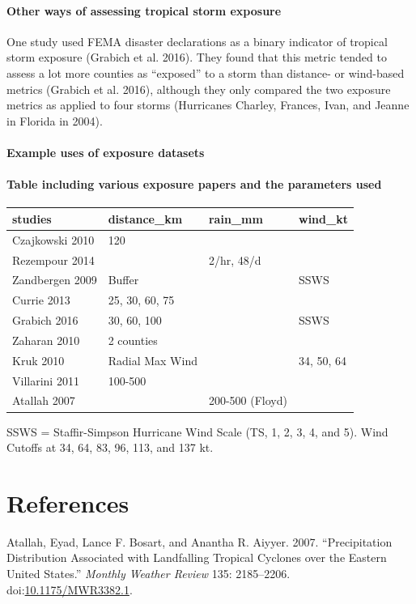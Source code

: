 \documentclass[]{elsarticle} %
\begin{document}
\paragraph{Other ways of assessing tropical storm
exposure}\label{other-ways-of-assessing-tropical-storm-exposure}

One study used FEMA disaster declarations as a binary indicator of
tropical storm exposure (Grabich et al. 2016). They found that this
metric tended to assess a lot more counties as ``exposed'' to a storm
than distance- or wind-based metrics (Grabich et al. 2016), although
they only compared the two exposure metrics as applied to four storms
(Hurricanes Charley, Frances, Ivan, and Jeanne in Florida in 2004).

\paragraph{Example uses of exposure
datasets}\label{example-uses-of-exposure-datasets}

\paragraph{Table including various exposure papers and the parameters
used}\label{table-including-various-exposure-papers-and-the-parameters-used}

\begin{longtable}[]{@{}llll@{}}
\toprule
studies & distance\_km & rain\_mm & wind\_kt\tabularnewline
\midrule
\endhead
Czajkowski 2010 & 120 & &\tabularnewline
Rezempour 2014 & & 2/hr, 48/d &\tabularnewline
Zandbergen 2009 & Buffer & & SSWS\tabularnewline
Currie 2013 & 25, 30, 60, 75 & &\tabularnewline
Grabich 2016 & 30, 60, 100 & & SSWS\tabularnewline
Zaharan 2010 & 2 counties & &\tabularnewline
Kruk 2010 & Radial Max Wind & & 34, 50, 64\tabularnewline
Villarini 2011 & 100-500 & &\tabularnewline
Atallah 2007 & & 200-500 (Floyd) &\tabularnewline
\bottomrule
\end{longtable}

SSWS = Staffir-Simpson Hurricane Wind Scale (TS, 1, 2, 3, 4, and 5).
Wind Cutoffs at 34, 64, 83, 96, 113, and 137 kt.

\section*{References}\label{references}

\hypertarget{refs}{}
\hypertarget{ref-Atallah2007}{}
Atallah, Eyad, Lance F. Bosart, and Anantha R. Aiyyer. 2007.
``Precipitation Distribution Associated with Landfalling Tropical
Cyclones over the Eastern United States.'' \emph{Monthly Weather Review}
135: 2185--2206.
doi:\href{https://doi.org/10.1175/MWR3382.1}{10.1175/MWR3382.1}.
\end{document}
